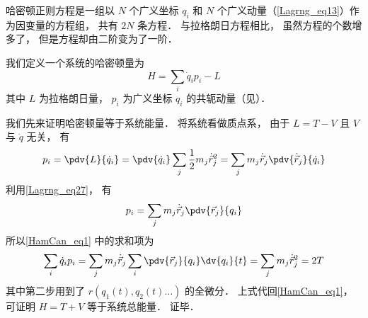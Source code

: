

哈密顿正则方程是一组以 $N$ 个广义坐标 $q_i$ 和 $N$ 个广义动量（\autoref{Lagrng_eq13}）作为因变量的方程组， 共有 $2N$ 条方程． 与拉格朗日方程相比， 虽然方程的个数增多了， 但是方程却由二阶变为了一阶．

我们定义一个系统的哈密顿量为
\begin{equation}\label{HamCan_eq1}
H = \sum_i \dot q_i p_i - L
\end{equation}
其中 $L$ 为拉格朗日量， $p_i$ 为广义坐标 $q_i$ 的共轭动量（见）．

我们先来证明哈密顿量等于系统能量． 将系统看做质点系， 由于 $L = T - V$ 且 $V$ 与 $\dot q$ 无关， 有
\begin{equation}
p_i = \pdv{L}{\dot q_i} = \pdv{\dot q_i} \sum_j \frac12 m_j \dot{\vec r}_j^2
= \sum_j m_j \dot{\vec r}_j \pdv{\dot{\vec r}_j}{\dot q_i}
\end{equation}
利用\autoref{Lagrng_eq27}， 有
\begin{equation}
p_i = \sum_j m_j \dot{\vec r}_j  \pdv{\vec r_j}{q_i}
\end{equation}
所以\autoref{HamCan_eq1} 中的求和项为
\begin{equation}
 \sum_i \dot q_i p_i = \sum_j m_j \dot{\vec r}_j \sum_i \pdv{\vec r_j}{q_i}\dv{q_i}{t}
= \sum_j m_j \dot{\vec r}_j^2 = 2T
\end{equation}
其中第二步用到了 $r(q_1(t), q_2(t) \dots)$ 的全微分． 上式代回\autoref{HamCan_eq1}， 可证明 $H = T + V$ 等于系统总能量． 证毕．